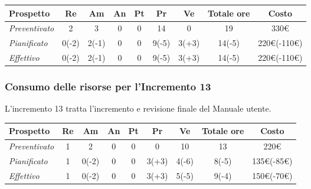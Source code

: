 {{{{{{{{{{{{{	\begin{center}
		\renewcommand{\arraystretch}{1.4}
		\begin{tabularx}{\textwidth}{|X|c|c|c|c|c|c|c|c|}
			\hline
			\rowcolor{airforceblue}
			\textbf{Prospetto} & \textbf{Re} & \textbf{Am} & \textbf{An} & \textbf{Pt} & \textbf{Pr} & \textbf{Ve} & \textbf{Totale ore} & \textbf{Costo} \\
			\hline
			\textit{Preventivato} & 2 & 3 & 0 & 0 & 14 & 0 & 19 & 330\euro \\
			\hline
			\textit{Pianificato} & 0(-2) & 2(-1) & 0 & 0 & 9(-5) & 3(+3) & 14(-5) & 220\euro(-110\euro) \\
			\hline
			\textit{Effettivo} & 0(-2) & 2(-1) & 0 & 0 & 9(-5) & 3(+3) & 14(-5) & 220\euro(-110\euro) \\
			\hline
		\end{tabularx}
	\end{center}

\subsubsection{Consumo delle risorse per l'Incremento 13}
L'incremento 13 tratta l'incremento e revisione finale del Manuale utente.
\quad
\def\tabularxcolumn#1{m{#1}}
{

	\begin{center}
		\renewcommand{\arraystretch}{1.4}
		\begin{tabularx}{\textwidth}{|X|c|c|c|c|c|c|c|c|}
			\hline
			\rowcolor{airforceblue}
			\textbf{Prospetto} & \textbf{Re} & \textbf{Am} & \textbf{An} & \textbf{Pt} & \textbf{Pr} & \textbf{Ve} & \textbf{Totale ore} & \textbf{Costo} \\
			\hline
			\textit{Preventivato} & 1 & 2 & 0 & 0 & 0 & 10 & 13 & 220\euro\\
			\hline
			\textit{Pianificato} & 1 & 0(-2) & 0 & 0 & 3(+3) & 4(-6) & 8(-5) & 135\euro(-85\euro) \\
			\hline
			\textit{Effettivo} & 1 & 0(-2) & 0 & 0 & 3(+3) & 5(-5) & 9(-4) & 150\euro(-70\euro) \\
			\hline
		\end{tabularx}
	\end{center}

}}}}}}}}}}}}}}
